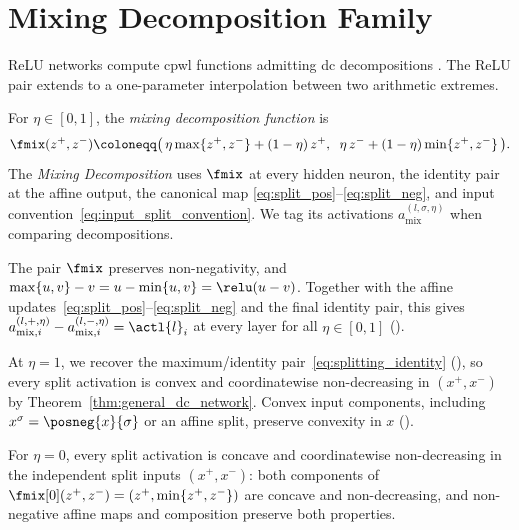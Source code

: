 \section{Mixing Decomposition Family}\label{sec:mixing_decomposition}

ReLU networks compute \ac{cpwl} functions \parencite{Arora2018} admitting \ac{dc} decompositions \parencite{Melzer1986_PLasDC,Kripfganz1987_PWAasDC,hiddenMono}. The ReLU pair extends to a one-parameter interpolation between two arithmetic extremes.

\begin{definition}\label{def:fmix}
For $\eta \in [0,1]$, the \emph{mixing decomposition function} is
\begin{equation}
	\fmix(z^+, z^-) \coloneqq \bigl(\, \eta \max\{z^+, z^-\} + (1-\eta)\, z^+, \;\; \eta\, z^- + (1-\eta) \min\{z^+, z^-\} \,\bigr).
	\label{eq:fmix_def}
\end{equation}
The \emph{Mixing Decomposition} uses $\fmix$ at every hidden neuron, the identity pair at the affine output, the canonical map \eqref{eq:split_pos}--\eqref{eq:split_neg}, and input convention~\eqref{eq:input_split_convention}. We tag its activations $a_{\mathrm{mix}}^{(l,\sigma,\eta)}$ when comparing decompositions.
\end{definition}

The pair $\fmix$ preserves non-negativity, and $\max\{u,v\}-v=u-\min\{u,v\}=\relu(u-v)$. Together with the affine updates~\eqref{eq:split_pos}--\eqref{eq:split_neg} and the final identity pair, this gives $a_{\mathrm{mix},i}^{(l,+,\eta)}-a_{\mathrm{mix},i}^{(l,-,\eta)}=\actl{l}_i$ at every layer for all $\eta\in[0,1]$ ().

At $\eta=1$, we recover the maximum/identity pair~\eqref{eq:splitting_identity} (), so every split activation is convex and coordinatewise non-decreasing in $(x^+,x^-)$ by Theorem~\ref{thm:general_dc_network}. Convex input components, including $x^\sigma=\posneg{x}{\sigma}$ or an affine split, preserve convexity in $x$ ().

\begin{remark}[The $\eta=0$ endpoint]\label{rem:eta_zero_extreme}
For $\eta=0$, every split activation is concave and coordinatewise non-decreasing in the independent split inputs $(x^+,x^-)$: both components of $\fmix[0](z^+,z^-)=(z^+,\min\{z^+,z^-\})$ are concave and non-decreasing, and non-negative affine maps and composition preserve both properties.
\end{remark}

